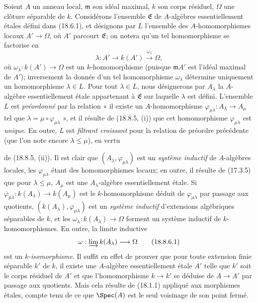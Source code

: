 \begin{env}[18.8.6]
\label{IV.18.8.6}
Soient $A$ un anneau local, $\mathfrak m$ son idéal maximal, $k$ son corps résiduel, $\Omega$ une clôture séparable de $k$. Considérons l'ensemble $\mathfrak E$ de $A$-algèbres essentiellement étales défini dans (18.6.1), et désignons par $L$ l'ensemble des $A$-homomorphismes locaux $A'\to\Omega$, où $A'$ parcourt $\mathfrak E$; on notera qu'un tel homomorphisme se factorise en
\[
  \lambda:A'\longrightarrow k(A')\xrightarrow{\omega_\lambda}\Omega,
\]
où $\omega_\lambda:k(A')\to\Omega$ est un $k$-homomorphisme (puisque $\mathfrak mA'$ est l'idéal maximal de $A'$); inversement la donnée d'un tel homomorphisme $\omega_\lambda$ détermine uniquement un homomorphisme $\lambda\in L$. Pour tout $\lambda\in L$, nous désignerons par $A_\lambda$ la $A$-algèbre essentiellement étale appartenant à $\mathfrak E$ sur laquelle $\lambda$ est défini. L'ensemble $L$ est \emph{préordonné} par la relation « il existe un $A$-homomorphisme $\varphi_{\mu\lambda}:A_\lambda\to A_\mu$ tel que $\lambda=\mu\circ\varphi_{\mu\lambda}$ », et il résulte de (18.8.5, (i)) que cet homomorphisme $\varphi_{\mu\lambda}$ est \emph{unique}. En outre, $L$ est \emph{filtrant croissant} pour la relation de préordre précédente (que l'on note encore $\lambda\leq\mu$), en vertu


de (18.8.5, (ii)). Il est clair que $(A_\lambda,\varphi_{\mu\lambda})$ est un \emph{système inductif} de $A$-algèbres locales, les $\varphi_{\mu\lambda}$ étant des homomorphismes locaux; en outre, il résulte de (17.3.5) que pour $\lambda\leq\mu$, $A_\mu$ est une $A_\lambda$-algèbre essentiellement étale. Si $\overline\varphi_{\mu\lambda}:k(A_\lambda)\to k(A_\mu)$ est le $k$-homomorphisme déduit de $\varphi_{\mu\lambda}$ par passage aux quotients, $(k(A_\lambda),\overline\varphi_{\mu\lambda})$ est un \emph{système inductif} d'extensions algébriques séparables de $k$, et les $\omega_\lambda:k(A_\lambda)\to\Omega$ forment un système inductif de $k$-homomorphismes. En outre, la limite inductive
\begin{equation}
  \omega:\varinjlim k(A_\lambda)\longrightarrow\Omega
  \label{IV.18.8.6.1}
  \tag{18.8.6.1}
\end{equation}
est un $k$-\emph{isomorphisme}. Il suffit en effet de prouver que pour toute extension finie séparable $k'$ de $k$, il existe une $A$-algèbre essentiellement étale $A'$ telle que $k'$ soit le corps résiduel de $A'$ et que l'homomorphisme $k\to k'$ se déduise de $A\to A'$ par passage aux quotients. Mais cela résulte de (18.1.1) appliqué aux morphismes étales, compte tenu de ce que $\Spec(A)$ est le seul voisinage de son point fermé.


\end{env}
